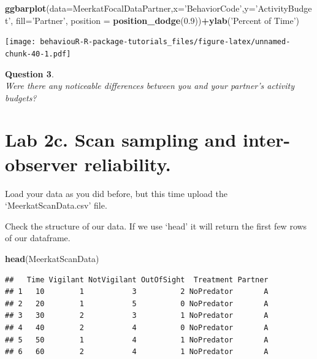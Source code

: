 \documentclass[]{book}
\newenvironment{Shaded}{\begin{snugshade}}{\end{snugshade}}
\newcommand{\DataTypeTok}[1]{\textcolor[rgb]{0.13,0.29,0.53}{#1}}
\newcommand{\FloatTok}[1]{\textcolor[rgb]{0.00,0.00,0.81}{#1}}
\newcommand{\KeywordTok}[1]{\textcolor[rgb]{0.13,0.29,0.53}{\textbf{#1}}}
\newcommand{\NormalTok}[1]{#1}
\newcommand{\OperatorTok}[1]{\textcolor[rgb]{0.81,0.36,0.00}{\textbf{#1}}}
\newcommand{\StringTok}[1]{\textcolor[rgb]{0.31,0.60,0.02}{#1}}
\begin{document}
\begin{Shaded}
\begin{Highlighting}[]
\KeywordTok{ggbarplot}\NormalTok{(}\DataTypeTok{data=}\NormalTok{MeerkatFocalDataPartner,}\DataTypeTok{x=}\StringTok{'BehaviorCode'}\NormalTok{,}\DataTypeTok{y=}\StringTok{'ActivityBudget'}\NormalTok{, }\DataTypeTok{fill=}\StringTok{'Partner'}\NormalTok{,}
          \DataTypeTok{position =} \KeywordTok{position_dodge}\NormalTok{(}\FloatTok{0.9}\NormalTok{))}\OperatorTok{+}\KeywordTok{ylab}\NormalTok{(}\StringTok{'Percent of Time'}\NormalTok{)}
\end{Highlighting}
\end{Shaded}

\texttt{[image: behaviouR-R-package-tutorials\_files/figure-latex/unnamed-chunk-40-1.pdf]}

\textbf{Question 3}.\\
\emph{Were there any noticeable differences between you and your partner's activity budgets?}

\hypertarget{lab-2c.-scan-sampling-and-inter-observer-reliability.}{%
\section*{Lab 2c. Scan sampling and inter-observer reliability.}\label{lab-2c.-scan-sampling-and-inter-observer-reliability.}}

Load your data as you did before, but this time upload the `MeerkatScanData.csv' file.

Check the structure of our data. If we use `head' it will return the first few rows of our dataframe.

\begin{Shaded}
\begin{Highlighting}[]
\KeywordTok{head}\NormalTok{(MeerkatScanData)}
\end{Highlighting}
\end{Shaded}

\begin{verbatim}
##   Time Vigilant NotVigilant OutOfSight  Treatment Partner
## 1   10        1           3          2 NoPredator       A
## 2   20        1           5          0 NoPredator       A
## 3   30        2           3          1 NoPredator       A
## 4   40        2           4          0 NoPredator       A
## 5   50        1           4          1 NoPredator       A
## 6   60        2           4          1 NoPredator       A
\end{verbatim}
\end{document}
